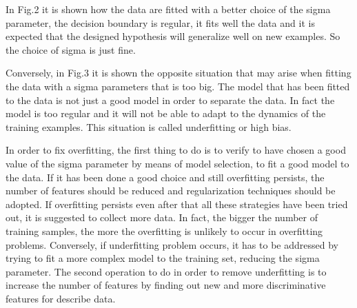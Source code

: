 \documentclass[aps,letterpaper,10pt]{revtex4}
\begin{document}
In Fig.2 it is shown how the data are fitted with a better choice of the sigma parameter, the
decision boundary is regular, it fits well the data and it is expected that the designed hypothesis will generalize well on new examples. So the choice of sigma is just fine. 

Conversely, in Fig.3 it is shown the opposite situation that may arise when fitting the data with a sigma parameters that is too big. The model that has been fitted to the data is not just a good model in order to separate the data. In fact the model is too regular and it will not be able to adapt to the dynamics of the training examples. This situation is called underfitting or high bias. 

In order to fix overfitting, the first thing to do is to verify to have chosen a good value of the sigma parameter by means of model selection, to fit a good model to the data. If it has been done a good choice and still overfitting persists, the number of features should be reduced and regularization techniques should be adopted. If overfitting persists even after that all these strategies have been tried out, it is suggested to collect more data. In fact, the bigger the number of training samples, the more the overfitting is unlikely to occur in overfitting problems. Conversely, if underfitting problem occurs, it has to be addressed by trying to fit a more complex model to the training set, reducing the sigma parameter. The second operation to do in order to remove underfitting is to increase the number of features by finding out new and more discriminative features for describe data.
\end{document}
